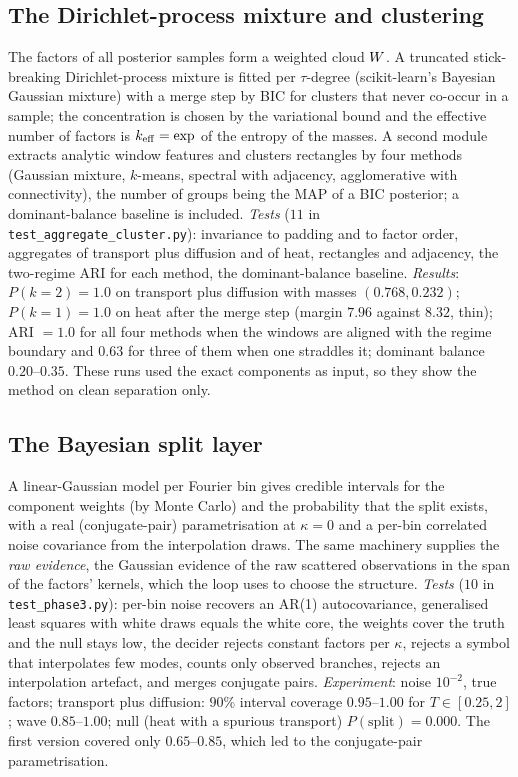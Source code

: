 \subsection{The Dirichlet-process mixture and clustering}\label{sec:dp}
The factors of all posterior samples form a weighted cloud $W$. A truncated stick-breaking Dirichlet-process mixture is fitted per $\tau$-degree (scikit-learn's Bayesian Gaussian mixture) with a merge step by BIC for clusters that never co-occur in a sample;
the concentration is chosen by the variational bound and the effective number of factors is $k_{\mathrm{eff}}=\exp$ of the entropy of the masses. A second module extracts analytic window features and clusters rectangles by four methods (Gaussian mixture, $k$-means, spectral with adjacency, agglomerative with connectivity),
the number of groups being the MAP of a BIC posterior; a dominant-balance baseline is included. \emph{Tests} ($11$ in \texttt{test\_aggregate\_cluster.py}): invariance to padding and to factor order, aggregates of transport plus diffusion and of heat, rectangles and adjacency, the two-regime ARI for each method, the dominant-balance baseline.
\emph{Results}: $P(k=2)=1.0$ on transport plus diffusion with masses $(0.768,0.232)$; $P(k=1)=1.0$ on heat after the merge step (margin $7.96$ against $8.32$, thin); ARI $=1.0$ for all four methods when the windows are aligned with the regime boundary and $0.63$ for three of them when one straddles it; dominant balance $0.20$--$0.35$.
These runs used the exact components as input, so they show the method on clean separation only.

\subsection{The Bayesian split layer}\label{sec:split}
A linear-Gaussian model per Fourier bin gives credible intervals for the component weights (by Monte Carlo) and the probability that the split exists, with a real (conjugate-pair) parametrisation at $\kappa=0$ and a per-bin correlated noise covariance from the interpolation draws.
The same machinery supplies the \emph{raw evidence}, the Gaussian evidence of the raw scattered observations in the span of the factors' kernels, which the loop uses to choose the structure. \emph{Tests} ($10$ in \texttt{test\_phase3.py}): per-bin noise recovers an AR(1) autocovariance,
generalised least squares with white draws equals the white core, the weights cover the truth and the null stays low, the decider rejects constant factors per $\kappa$, rejects a symbol that interpolates few modes, counts only observed branches, rejects an interpolation artefact, and merges conjugate pairs.
\emph{Experiment}: noise $10^{-2}$, true factors; transport plus diffusion: $90\%$ interval coverage $0.95$--$1.00$ for $T\in[0.25,2]$; wave $0.85$--$1.00$; null (heat with a spurious transport) $P(\text{split})=0.000$. The first version covered only $0.65$--$0.85$, which led to the conjugate-pair parametrisation.

